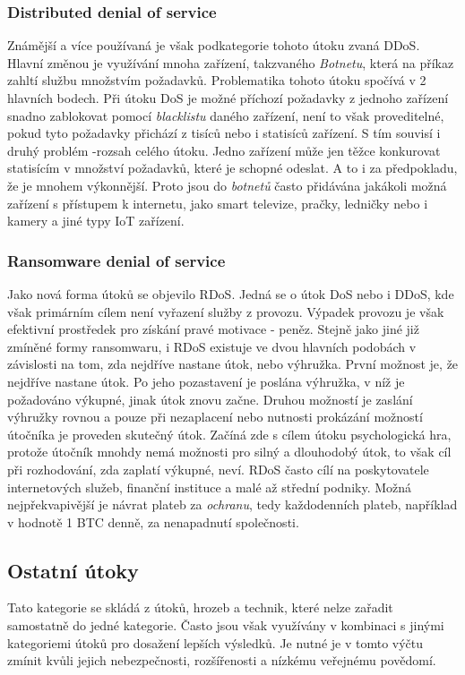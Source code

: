 \subsubsection{Distributed denial of service}
Známější a více používaná je však podkategorie tohoto útoku zvaná \ac{DDoS}.
Hlavní změnou je využívání mnoha zařízení, takzvaného \textit{Botnetu}, která na příkaz zahltí službu množstvím požadavků.
Problematika tohoto útoku spočívá v 2 hlavních bodech.
Při útoku \ac{DoS} je možné příchozí požadavky z jednoho zařízení snadno zablokovat pomocí \textit{blacklistu} daného zařízení, není to však proveditelné, pokud tyto požadavky přichází z tisíců nebo i statisíců zařízení.
S tím souvisí i druhý problém -rozsah celého útoku.
Jedno zařízení může jen těžce konkurovat statisícím v množství požadavků, které je schopné odeslat.
A to i za předpokladu, že je mnohem výkonnější.
Proto jsou do \textit{botnetů} často přidávána jakákoli možná zařízení s přístupem k internetu, jako smart televize, pračky, ledničky nebo i kamery a jiné typy \ac{IoT} zařízení.\cite{cisco_most_common_attack}



\subsubsection{Ransomware denial of service}
Jako nová forma útoků se objevilo \ac{RDoS}.
Jedná se o útok \ac{DoS} nebo i \ac{DDoS}, kde však primárním cílem není vyřazení služby z provozu.
Výpadek provozu je však efektivní prostředek pro získání pravé motivace - peněz.
Stejně jako jiné již zmíněné formy ransomwaru, i \ac{RDoS} existuje ve dvou hlavních podobách v závislosti na tom, zda nejdříve nastane útok, nebo výhružka.
První možnost je, že nejdříve nastane útok.
Po jeho pozastavení je poslána výhružka, v níž je požadováno výkupné, jinak útok znovu začne.
Druhou možností je zaslání výhružky rovnou a pouze při nezaplacení nebo nutnosti prokázání možností útočníka je proveden skutečný útok.
Začíná zde s cílem útoku psychologická hra, protože útočník mnohdy nemá možnosti pro silný a dlouhodobý útok, to však cíl při rozhodování, zda zaplatí výkupné, neví.
\ac{RDoS} často cílí na poskytovatele internetových služeb, finanční instituce a malé až střední podniky.
Možná nejpřekvapivější je návrat plateb za \textit{ochranu}, tedy každodenních plateb, například v hodnotě 1 BTC denně, za nenapadnutí společnosti.\cite{Enisa_thread_landscape}


\subsection{Ostatní útoky}\label{subsec:ostatni-utoky}
Tato kategorie se skládá z útoků, hrozeb a technik, které nelze zařadit samostatně do jedné kategorie.
Často jsou však využívány v kombinaci s jinými kategoriemi útoků pro dosažení lepších výsledků.
Je nutné je v tomto výčtu zmínit kvůli jejich nebezpečnosti, rozšířenosti a nízkému veřejnému povědomí.

